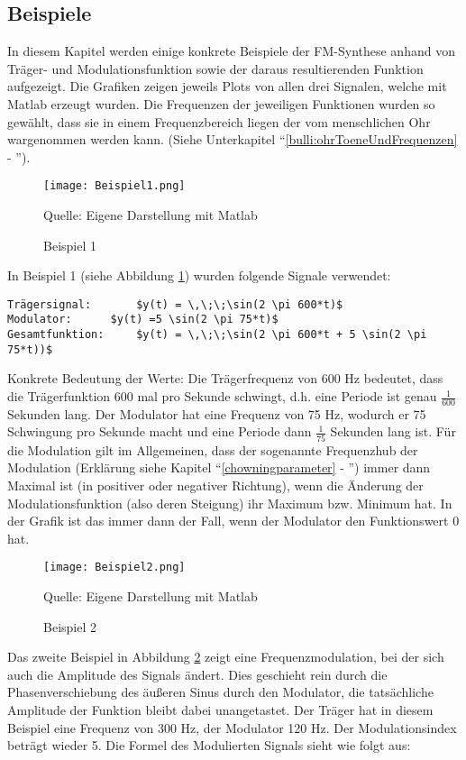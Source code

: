 \subsection{Beispiele}
In diesem Kapitel werden einige konkrete Beispiele der FM-Synthese anhand von Träger- und Modulationsfunktion sowie der daraus resultierenden Funktion aufgezeigt. Die Grafiken zeigen jeweils Plots von allen drei Signalen, welche mit Matlab erzeugt wurden.
Die Frequenzen der jeweiligen Funktionen wurden so gewählt, dass sie in einem Frequenzbereich liegen der vom menschlichen Ohr wargenommen werden kann. (Siehe Unterkapitel ``\ref{bulli:ohrToeneUndFrequenzen} - '').

\begin{figure} [ht]
\centering
  \texttt{[image: Beispiel1.png]}
\caption{Beispiel 1}
\label{fig:beispiel1}
Quelle: Eigene Darstellung mit Matlab
\end{figure}

In Beispiel 1 (siehe Abbildung \ref{fig:beispiel1})  wurden folgende Signale verwendet:

\begin{lstlisting}[mathescape]
Trägersignal: 		$y(t) = \,\;\;\sin(2 \pi 600*t)$
Modulator:		$y(t) =5 \sin(2 \pi 75*t)$
Gesamtfunktion: 	$y(t) = \,\;\;\sin(2 \pi 600*t + 5 \sin(2 \pi 75*t))$
\end{lstlisting}

Konkrete Bedeutung der Werte: Die Trägerfrequenz von 600 Hz bedeutet, dass die Trägerfunktion 600 mal pro Sekunde schwingt, d.h. eine Periode ist genau $\frac{1}{600}$ Sekunden lang. Der Modulator hat eine Frequenz von 75 Hz, wodurch er 75 Schwingung pro Sekunde macht und eine Periode dann $\frac{1}{75}$ Sekunden lang ist. Für die Modulation gilt im Allgemeinen, dass der sogenannte Frequenzhub der Modulation (Erklärung siehe Kapitel ``\ref{chowningparameter} - '') immer dann Maximal ist (in positiver oder negativer Richtung), wenn die Änderung der Modulationsfunktion (also deren Steigung) ihr Maximum bzw. Minimum hat. In der Grafik ist das immer dann der Fall, wenn der Modulator den Funktionswert 0 hat.

\begin{figure} [ht]
\centering
  \texttt{[image: Beispiel2.png]}
\caption{Beispiel 2}
\label{fig:beispiel2}
Quelle: Eigene Darstellung mit Matlab
\end{figure}

Das zweite Beispiel in Abbildung \ref{fig:beispiel2} zeigt eine Frequenzmodulation, bei der sich auch die Amplitude des Signals ändert. Dies geschieht rein durch die Phasenverschiebung des äußeren Sinus durch den Modulator, die tatsächliche Amplitude der Funktion bleibt dabei unangetastet. Der Träger hat in diesem Beispiel eine Frequenz von 300 Hz, der Modulator 120 Hz. Der Modulationsindex beträgt wieder 5. Die Formel des Modulierten Signals sieht wie folgt aus:

